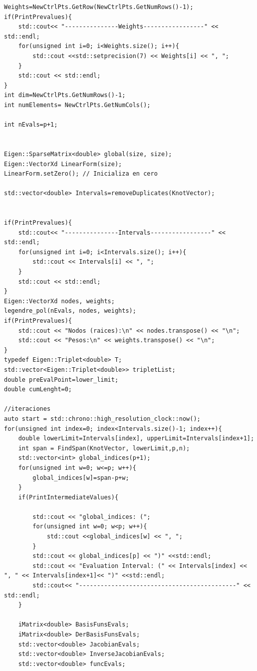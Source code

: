 \documentclass[11pt]{book}
\theoremstyle{plain} %
\theoremstyle{definition} %
\theoremstyle{definition} %
\begin{document}
\begin{verbatim}
Weights=NewCtrlPts.GetRow(NewCtrlPts.GetNumRows()-1);
if(PrintPrevalues){
    std::cout<< "---------------Weights-----------------" << std::endl;
    for(unsigned int i=0; i<Weights.size(); i++){
        std::cout <<std::setprecision(7) << Weights[i] << ", ";
    }
    std::cout << std::endl;
}
int dim=NewCtrlPts.GetNumRows()-1;
int numElements= NewCtrlPts.GetNumCols();

int nEvals=p+1;


Eigen::SparseMatrix<double> global(size, size);
Eigen::VectorXd LinearForm(size);
LinearForm.setZero(); // Inicializa en cero

std::vector<double> Intervals=removeDuplicates(KnotVector);


if(PrintPrevalues){
    std::cout<< "---------------Intervals-----------------" << std::endl;
    for(unsigned int i=0; i<Intervals.size(); i++){
        std::cout << Intervals[i] << ", ";
    }
    std::cout << std::endl;
}
Eigen::VectorXd nodes, weights;
legendre_pol(nEvals, nodes, weights);
if(PrintPrevalues){
    std::cout << "Nodos (raices):\n" << nodes.transpose() << "\n";
    std::cout << "Pesos:\n" << weights.transpose() << "\n"; 
}
typedef Eigen::Triplet<double> T;
std::vector<Eigen::Triplet<double>> tripletList;
double preEvalPoint=lower_limit;
double cumLenght=0;

//iteraciones 
auto start = std::chrono::high_resolution_clock::now();
for(unsigned int index=0; index<Intervals.size()-1; index++){
    double lowerLimit=Intervals[index], upperLimit=Intervals[index+1];
    int span = FindSpan(KnotVector, lowerLimit,p,n);
    std::vector<int> global_indices(p+1);
    for(unsigned int w=0; w<=p; w++){
        global_indices[w]=span-p+w;
    }
    if(PrintIntermediateValues){

        std::cout << "global_indices: (";
        for(unsigned int w=0; w<p; w++){
            std::cout <<global_indices[w] << ", ";
        }
        std::cout << global_indices[p] << ")" <<std::endl;
        std::cout << "Evaluation Interval: (" << Intervals[index] << ", " << Intervals[index+1]<< ")" <<std::endl;
        std::cout<< "--------------------------------------------" << std::endl;
    }
    
    iMatrix<double> BasisFunsEvals;
    iMatrix<double> DerBasisFunsEvals;
    std::vector<double> JacobianEvals;
    std::vector<double> InverseJacobianEvals;
    std::vector<double> funcEvals;
    

\end{verbatim}
\end{document}

